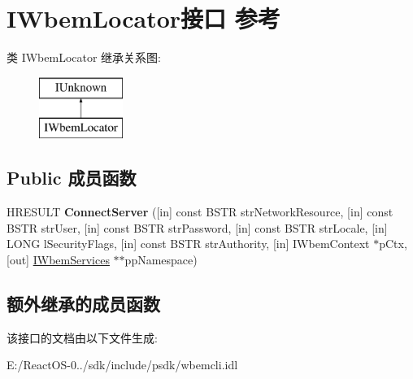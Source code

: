 \hypertarget{interface_i_wbem_locator}{}\section{I\+Wbem\+Locator接口 参考}
\label{interface_i_wbem_locator}
类 I\+Wbem\+Locator 继承关系图\+:\begin{figure}[H]
\begin{center}
\leavevmode
\includegraphics[height=2.000000cm]{interface_i_wbem_locator}
\end{center}
\end{figure}
\subsection*{Public 成员函数}
\begin{DoxyCompactItemize}
\item 
\mbox{\label{interface_i_wbem_locator_a03ccc39c09884ba0628aff6a1c8aec07}} 
H\+R\+E\+S\+U\+LT {\bfseries Connect\+Server} (\mbox{[}in\mbox{]} const B\+S\+TR str\+Network\+Resource, \mbox{[}in\mbox{]} const B\+S\+TR str\+User, \mbox{[}in\mbox{]} const B\+S\+TR str\+Password, \mbox{[}in\mbox{]} const B\+S\+TR str\+Locale, \mbox{[}in\mbox{]} L\+O\+NG l\+Security\+Flags, \mbox{[}in\mbox{]} const B\+S\+TR str\+Authority, \mbox{[}in\mbox{]} I\+Wbem\+Context $\ast$p\+Ctx, \mbox{[}out\mbox{]} \hyperlink{interface_i_wbem_services}{I\+Wbem\+Services} $\ast$$\ast$pp\+Namespace)
\end{DoxyCompactItemize}
\subsection*{额外继承的成员函数}


该接口的文档由以下文件生成\+:\begin{DoxyCompactItemize}
\item 
E\+:/\+React\+O\+S-\/0../sdk/include/psdk/wbemcli.\+idl\end{DoxyCompactItemize}
